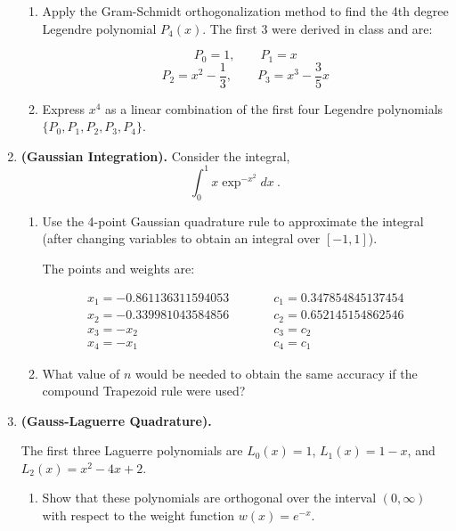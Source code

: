 \documentclass [12pt]{article}
\begin{document}
\begin{enumerate}
\begin{enumerate}
\item Apply the Gram-Schmidt orthogonalization method to find the
4th degree Legendre polynomial $P_4(x)$. The first 3 were derived
in class and are:

\[
P_0=1, \qquad P_1=x
\] \[
P_2=x^2-\frac 13, \qquad P_3=x^3-\frac 35 x
\]

\item Express $x^4$ as a linear combination of the first four
Legendre polynomials $\{P_0,P_1,P_2,P_3,P_4\}$.

\end{enumerate}


\item \textbf{(Gaussian Integration).}  Consider the integral,
$$
\int_0^1 {x \exp ^{-x^2}} dx~.
$$

\begin{enumerate}

\item Use the 4-point Gaussian quadrature rule to approximate the
integral (after changing variables to obtain an integral over
$[-1,1]$).

\vskip 5pt \noindent
The points and weights are:

$$\begin{array}{ll}
x_1 = -0.861136311594053 \;\;\;\;\;\;\;\;\;\; & c_1 = 0.347854845137454 \\

x_2 = -0.339981043584856  & c_2 = 0.652145154862546 \\

x_3 = -x_2                & c_3 = c_2 \\

x_4 = -x_1                & c_4 = c_1
\end{array} $$

\item What value of $n$ would be needed to obtain the same
accuracy if the compound Trapezoid rule were used?

\end{enumerate}




\item  \textbf{(Gauss-Laguerre Quadrature).} 

The first three Laguerre polynomials are $L_0(x)=1$,
$L_1(x)=1-x$, and $L_2(x)=x^2-4x+2$.

\begin{enumerate}

\item Show that these polynomials are orthogonal over the interval
$(0,\infty)$ with respect to the weight function $w(x)=e^{-x}$.


\end{enumerate}
\end{enumerate}
\end{document}
